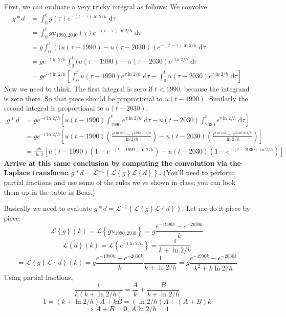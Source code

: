 \documentclass[answers]{exam}\newcommand{\repositoryInformationSetup}{     \usepackage[dvipsnames]{xcolor}     \usepackage[ angle=90, color=black, opacity=1, scale=2, ]{background}      \SetBgPosition{current page.west}      \SetBgVshift{-4.5mm}      \backgroundsetup{contents={{\color{green}\texttt{-{}-} differs from commit \texttt{40a9b87} in 0 files}}} } \newcommand{\commit}{{{\color{green}40a9b87}}}\usepackage{amsmath}
\newcommand{\laplace}[1]{\ensuremath{\mathcal{L}\left\{#1\right\}}\xspace}
\newcommand{\inverselaplace}[1]{\ensuremath{\mathcal{L}\inverse\left\{#1\right\}}\xspace}
\newcommand{\oneover}[1]{\ensuremath{\frac{1}{#1}}}                             \newcommand{\inverse}{\ensuremath{^{-1}}}                                       \providecommand{\half}{\ensuremath{\frac{1}{2}} }                               \renewcommand{\half}{\ensuremath{\frac{1}{2}} }                                 \newcommand{\quarter}{\ensuremath{\frac{1}{4}} }
\providecommand{\id}{}
\renewcommand{\id}[1]{\ensuremath{\; \mathrm{d}#1}}
\begin{document}
\begin{questions}
	First, we can evaluate a very tricky integral as follows:
	We convolve
	\begin{align*}
		g*d
		 & =	\int_{0}^{t} g(\tau) e^{-(t-\tau) \ln 2/h} \id{\tau}
		\\	&=	\int_{0}^{t} g u_{1990,2030}(\tau) e^{-(t-\tau) \ln 2/h} \id{\tau}
		\\	&=	g \int_{0}^{t} \left((u(\tau-1990) - u(\tau-2030)\right) e^{-(t-\tau) \ln 2/h} \id{\tau}
		\\	&=	g e^{-t \ln 2/h} \int_{0}^{t} (u(\tau-1990) - u(\tau-2030) e^{\tau \ln 2/h} \id{\tau}
		\\	&=	g e^{-t \ln 2/h} \left[\int_{0}^{t} u(\tau-1990) e^{\tau \ln 2/h} \id{\tau} - \int_{0}^{t} u(\tau-2030) e^{\tau \ln 2/h} \id{\tau}\right]
	\end{align*}
	Now we need to think.  The first integral is zero if $t<1990$, because the integrand is zero there.  So that piece should be proprotional to $u(t-1990)$.
	Similarly the second integral is proportional to $u(t-2030)$.
	\begin{align*}
		g*d
		 & =	g e^{-t \ln 2/h} \left[ u(t-1990)\int_{1990}^t e^{\tau \ln 2/h} \id{\tau} - u(t-2030)\int_{2030}^{t} e^{\tau \ln 2/h} \id{\tau}\right]
		\\	&=	g e^{-t \ln 2/h} \left[ u(t-1990) \left(\frac{e^{t \ln2/h}-e^{1990 \ln 2/h}}{\ln 2/h}\right) - u(t-2030) \left(\frac{e^{t \ln 2/h} - e^{2030 \ln 2/h}}{\ln 2 / h}\right)\right]
		\\	&=	\frac{gh}{\ln 2} \left[u(t-1990)\left(1-e^{-(t-1990) \ln 2/h} \right)- u(t-2030)\left(1-e^{-(t-2030) \ln 2 / h}\right)\right]
	\end{align*}
	{\bf Arrive at this same conclusion by computing the convolution via the Laplace transform: $g*d = \inverselaplace{\laplace{g} \laplace{d}}$.} (You'll need to perform partial fractions and use some of the rules we've shown in class; you can look them up in the table in Boas.)
	\begin{solution}
		Basically we need to evaluate $g*d = \inverselaplace{\laplace{g} \laplace{d}}$. Let me do it piece by piece:
		$$\laplace{g}(k) = \laplace{gu_{1990,2030}} = g \frac{e^{-1990k} - e^{-2030k}}{k}$$
		$$\laplace{d}(k) = \laplace{e^{-t \ln2/h}} = \oneover{k+\ln2/h}$$
		$$ = \laplace{g} \laplace{d}(k) = g \frac{e^{-1990k} - e^{-2030k}}{k} \oneover{k+\ln2/h} = g \frac{e^{-1990k} - e^{-2030k}}{k^2+k\ln2/h}$$
		Using partial fractions, 
		$$  \frac{1}{k (k + \ln2/h)} = \frac{A}{k} + \frac{B}{k + \ln2/h} $$
		$$ 1 = (k + \ln2/h)A + kB = (\ln2/h)A + (A+B)k $$
		$$ \Rightarrow A + B = 0 \textbf{, } A\ln2/h = 1$$

\end{solution}
\end{questions}
\end{document}
